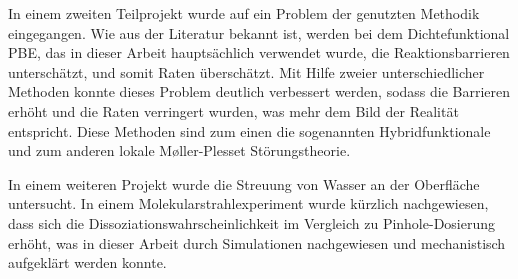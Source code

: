 \documentclass[11pt,DIV=13,a4paper,headinclude,german]{scrartcl}
\begin{document}
In einem zweiten Teilprojekt wurde auf ein Problem der genutzten Methodik eingegangen.
Wie aus der Literatur bekannt ist, werden bei dem Dichtefunktional PBE, das in dieser Arbeit hauptsächlich verwendet wurde, die Reaktionsbarrieren unterschätzt, und somit Raten überschätzt.
Mit Hilfe zweier unterschiedlicher Methoden konnte dieses Problem deutlich verbessert werden, sodass die Barrieren erhöht und die Raten verringert wurden, was mehr dem Bild der Realität entspricht.
Diese Methoden sind zum einen die sogenannten Hybridfunktionale und zum anderen lokale M\o{}ller-Plesset Störungstheorie.

In einem weiteren Projekt wurde die Streuung von Wasser an der Oberfläche untersucht.
In einem Molekularstrahlexperiment wurde kürzlich nachgewiesen, dass sich die Dissoziationswahrscheinlichkeit im Vergleich zu Pinhole-Dosierung erhöht, was in dieser Arbeit durch Simulationen nachgewiesen und mechanistisch aufgeklärt werden konnte.
\end{document}
